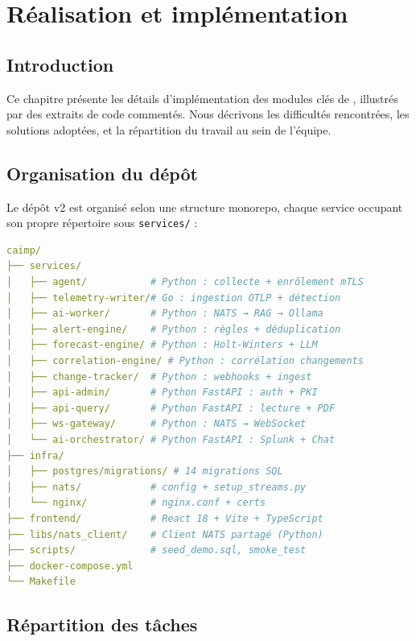 \chapter{Réalisation et implémentation}

\section*{Introduction}

Ce chapitre présente les détails d'implémentation des modules clés de \caimp{},
illustrés par des extraits de code commentés. Nous décrivons les difficultés
rencontrées, les solutions adoptées, et la répartition du travail au sein
de l'équipe.

\section{Organisation du dépôt}

Le dépôt \caimp{} v2 est organisé selon une structure monorepo, chaque service
occupant son propre répertoire sous \texttt{services/} :

\begin{lstlisting}[language=YAML, caption={Structure du dépôt CAIMP}]
caimp/
├── services/
│   ├── agent/           # Python : collecte + enrôlement mTLS
│   ├── telemetry-writer/# Go : ingestion OTLP + détection
│   ├── ai-worker/       # Python : NATS → RAG → Ollama
│   ├── alert-engine/    # Python : règles + déduplication
│   ├── forecast-engine/ # Python : Holt-Winters + LLM
│   ├── correlation-engine/ # Python : corrélation changements
│   ├── change-tracker/  # Python : webhooks + ingest
│   ├── api-admin/       # Python FastAPI : auth + PKI
│   ├── api-query/       # Python FastAPI : lecture + PDF
│   ├── ws-gateway/      # Python : NATS → WebSocket
│   └── ai-orchestrator/ # Python FastAPI : Splunk + Chat
├── infra/
│   ├── postgres/migrations/ # 14 migrations SQL
│   ├── nats/            # config + setup_streams.py
│   └── nginx/           # nginx.conf + certs
├── frontend/            # React 18 + Vite + TypeScript
├── libs/nats_client/    # Client NATS partagé (Python)
├── scripts/             # seed_demo.sql, smoke_test
├── docker-compose.yml
└── Makefile
\end{lstlisting}

\section{Répartition des tâches}

